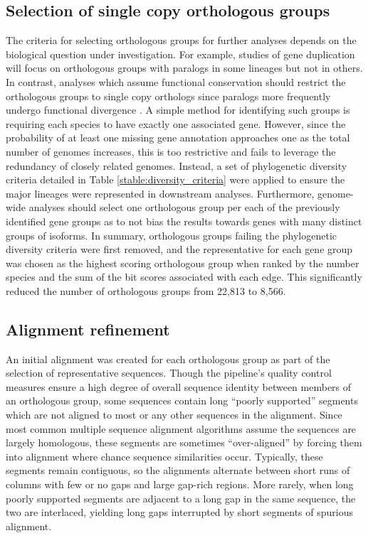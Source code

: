 \documentclass[10pt,letterpaper]{article}
\begin{document}
\subsection*{Selection of single copy orthologous groups}
The criteria for selecting orthologous groups for further analyses depends on the biological question under investigation. For example, studies of gene duplication will focus on orthologous groups with paralogs in some lineages but not in others. In contrast, analyses which assume functional conservation should restrict the orthologous groups to single copy orthologs since paralogs more frequently undergo functional divergence \cite{Altenhoff2012, Pegueroles2013, Soria2014}. A simple method for identifying such groups is requiring each species to have exactly one associated gene. However, since the probability of at least one missing gene annotation approaches one as the total number of genomes increases, this is too restrictive and fails to leverage the redundancy of closely related genomes. Instead, a set of phylogenetic diversity criteria detailed in Table \ref{stable:diversity_criteria} were applied to ensure the major lineages were represented in downstream analyses. Furthermore, genome-wide analyses should select one orthologous group per each of the previously identified gene groups as to not bias the results towards genes with many distinct groups of isoforms. In summary, orthologous groups failing the phylogenetic diversity criteria were first removed, and the representative for each gene group was chosen as the highest scoring orthologous group when ranked by the number species and the sum of the bit scores associated with each edge. This significantly reduced the number of orthologous groups from 22,813 to 8,566.

\subsection*{Alignment refinement}
An initial alignment was created for each orthologous group as part of the selection of representative sequences. Though the pipeline’s quality control measures ensure a high degree of overall sequence identity between members of an orthologous group, some sequences contain long “poorly supported” segments which are not aligned to most or any other sequences in the alignment. Since most common multiple sequence alignment algorithms assume the sequences are largely homologous, these segments are sometimes “over-aligned” by forcing them into alignment where chance sequence similarities occur. Typically, these segments remain contiguous, so the alignments alternate between short runs of columns with few or no gaps and large gap-rich regions. More rarely, when long poorly supported segments are adjacent to a long gap in the same sequence, the two are interlaced, yielding long gaps interrupted by short segments of spurious alignment.
\end{document}
